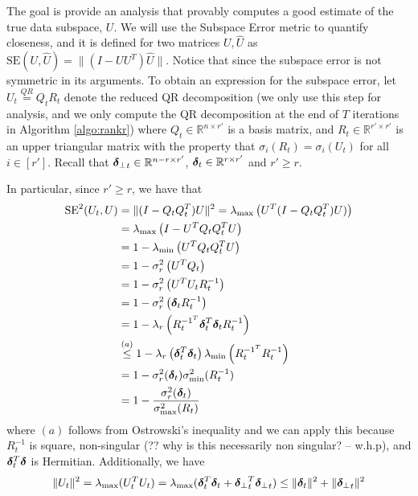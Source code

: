 \documentclass[10pt]{article}
\newcommand{\R}{\mathbb{R}}
\newcommand{\SE}{\mathrm{SE}}
\begin{document}
The goal is provide an analysis that provably computes a good estimate of the true data subspace, $U$. We will use the Subspace Error metric to quantify closeness, and it is defined for two matrices $U, \hat U$ as $\SE(U, \hat U) = \|(I - U U^T)\hat U\|$. Notice that since the subspace error is not symmetric in its arguments. To obtain an expression for the subspace error, let $U_t \overset{QR}{=} Q_t R_t$ denote the reduced QR decomposition (we only use this step for analysis, and we only compute the QR decomposition at the end of $T$ iterations in Algorithm \ref{algo:rankr}) where $Q_t \in \R^{n \times r'}$ is a basis matrix, and $R_t \in \R^{r' \times r'}$ is an upper triangular matrix with the property that $\sigma_i(R_t) = \sigma_i(U_t)$ for all $ i \in [r']$. Recall that $\utsin_t \in \R^{n -r \times r'}$, $\utcos_t \in \R^{r \times r'}$ and $r' \geq r$. 

In particular, since $r' \geq r$, we have that 
\begin{align*}
\SE^2(U_t, U) &= \|(I  - Q_t Q_t^T) U\|^2 = \lambda_{\max}\left(U^T (I - Q_tQ_t^T) U) \right) \\
&= \lambda_{\max}\left(I - U^T Q_tQ_t^T U  \right) \\
& = 1 - \lambda_{\min}\left(U^T Q_tQ_t^T U\right) \\
& = 1 - \sigma_{r}^2\left(U^T Q_t\right) \\
& = 1 - \sigma_{r}^2\left(U^T U_t R_t^{-1} \right) \\
& = 1 - \sigma_{r}^2\left(\utcos_t R_t^{-1} \right) \\
& = 1 - \lambda_{r}\left(R_t^{{-1}^T} \utcos_t ^T \utcos_t R_t^{-1}\right) \\
&\overset{(a)}{\leq}  1 - \lambda_{r}\left(\utcos_t^T \utcos_t \right) \lambda_{\min}\left( R_t^{{-1}^T} R_t^{-1}\right) \\
& = 1 - \sigma_r^2(\utcos_t) \sigma_{\min}^2(R_t^{-1}) \\
&= 1 - \frac{\sigma_r^2(\utcos_t)}{\sigma_{\max}^2(R_t)}
\end{align*}
where $(a)$ follows from Ostrowski's inequality \cite[Theorem 4.5.9]{horn_johnson} and we can apply this because $R_t^{-1}$ is square, non-singular (?? why is this necessarily non singular? -- w.h.p), and $\bm{\delta}_t^T \bm{\delta}$ is Hermitian.  Additionally, we have 
\begin{align*}
\|U_t\|^2 = \lambda_{\max}(U_t^T U_t) = \lambda_{\max} (\bm{\delta}_t^T \bm{\delta}_t + {\bm{\delta}_{\perp}}_t^T {\bm{\delta}_{\perp}}_t) \leq \|\bm{\delta}_t\|^2 + \|{\bm{\delta}_{\perp}}_t\|^2
\end{align*}
\end{document}
